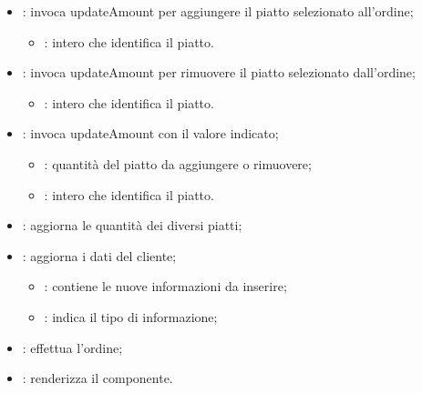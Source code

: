 \begin{itemize}
	\item {}: invoca updateAmount per aggiungere il piatto selezionato all'ordine;
		\begin{itemize}
			\item {}: intero che identifica il piatto.
		\end{itemize}
	\item {}: invoca updateAmount per rimuovere il piatto selezionato dall'ordine;
		\begin{itemize}
			\item {}: intero che identifica il piatto.
		\end{itemize}
	\item {}: invoca updateAmount con il valore indicato;
		\begin{itemize}
			\item {}: quantità del piatto da aggiungere o rimuovere;
			\item {}: intero che identifica il piatto.
		\end{itemize}
	\item {}: aggiorna le quantità dei diversi piatti;
	\item {}: aggiorna i dati del cliente;
		\begin{itemize}
			\item {}: contiene le nuove informazioni da inserire;
			\item {}: indica il tipo di informazione;
		\end{itemize}
	\item {}: effettua l'ordine;
	\item {}: renderizza il componente.
\end{itemize}
